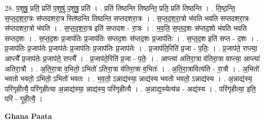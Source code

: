 \documentclass[17pt]{extarticle}
\begin{document}
28. प॒शुषु॒ प्रति॒ प्रति॑ प॒शुषु॑ प॒शुषु॒ प्रति॑ । . प्रति॑ तिष्ठन्ति तिष्ठन्ति॒ प्रति॒ प्रति॑ तिष्ठन्ति । . ति॒ष्ठ॒न्ति॒ स॒प्त॒द॒श॒रा॒त्रः स॑प्तदशरा॒त्र स्ति॑ष्ठन्ति तिष्ठन्ति सप्तदशरा॒त्रः । . स॒प्त॒द॒श॒रा॒त्रो भ॑वति भवति सप्तदशरा॒त्रः स॑प्तदशरा॒त्रो भ॑वति । . स॒प्त॒द॒श॒रा॒त्र इति॑ सप्तदश - रा॒त्रः । . भ॒व॒ति॒ स॒प्त॒द॒शः स॑प्तद॒शो भ॑वति भवति सप्तद॒शः । . स॒प्त॒द॒शः प्र॒जाप॑तिः प्र॒जाप॑तिः सप्तद॒शः स॑प्तद॒शः प्र॒जाप॑तिः । . स॒प्त॒द॒श इति॑ सप्त - द॒शः । . प्र॒जाप॑तिः प्र॒जाप॑तेः प्र॒जाप॑तेः प्र॒जाप॑तिः प्र॒जाप॑तिः प्र॒जाप॑तेः । . प्र॒जाप॑ति॒रिति॑ प्र॒जा - प॒तिः॒ । . प्र॒जाप॑ते॒ राप्त्या॒ आप्त्यै᳚ प्र॒जाप॑तेः प्र॒जाप॑ते॒ राप्त्यै᳚ । . प्र॒जाप॑ते॒रिति॑ प्र॒जा - प॒तेः॒ । . आप्त्या॑ अतिरा॒त्रा व॑तिरा॒त्रा वाप्त्या॒ आप्त्या॑ अतिरा॒त्रौ । . अ॒ति॒रा॒त्रा व॒भितो॒ ऽभितो॑ ऽतिरा॒त्रा व॑तिरा॒त्रा व॒भितः॑ । . अ॒ति॒रा॒त्रावित्य॑ति - रा॒त्रौ । . अ॒भितो॑ भवतो भवतो॒ ऽभितो॒ ऽभितो॑ भवतः । . भ॒व॒तो॒ ऽन्नाद्य॑स्या॒ न्नाद्य॑स्य भवतो भवतो॒ ऽन्नाद्य॑स्य । . अ॒न्नाद्य॑स्य॒ परि॑गृहीत्यै॒ परि॑गृहीत्या अ॒न्नाद्य॑स्या॒ न्नाद्य॑स्य॒ परि॑गृहीत्यै । . अ॒न्नाद्य॒स्येत्य॑न्न - अद्य॑स्य । . परि॑गृहीत्या॒ इति॒ परि॑ - गृ॒ही॒त्यै॒ । \newline

\textbf{Ghana Paata } \newline
\end{document}
